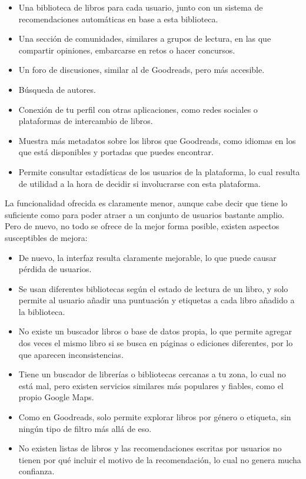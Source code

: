 \begin{itemize}
\item Una biblioteca de libros para cada usuario, junto con un sistema de recomendaciones automáticas en base a esta biblioteca.
\item Una sección de comunidades, similares a grupos de lectura, en las que compartir opiniones, embarcarse en retos o hacer concursos.
\item Un foro de discusiones, similar al de Goodreads, pero más accesible.
\item Búsqueda de autores.
\item Conexión de tu perfil con otras aplicaciones, como redes sociales o plataformas de intercambio de libros.
\item Muestra más metadatos sobre los libros que Goodreads, como idiomas en los que está disponibles y portadas que puedes encontrar.
\item Permite consultar estadísticas de los usuarios de la plataforma, lo cual resulta de utilidad a la hora de decidir si involucrarse con esta plataforma.
\end{itemize}

La funcionalidad ofrecida es claramente menor, aunque cabe decir que tiene lo suficiente como para poder atraer a un conjunto de usuarios bastante amplio. Pero de nuevo, no todo se ofrece de la mejor forma posible, existen aspectos susceptibles de mejora:

\begin{itemize}
\item De nuevo, la interfaz resulta claramente mejorable, lo que puede causar pérdida de usuarios.
\item Se usan diferentes bibliotecas según el estado de lectura de un libro, y solo permite al usuario añadir una puntuación y etiquetas a cada libro añadido a la biblioteca.
\item No existe un buscador libros o base de datos propia, lo que permite agregar dos veces el mismo libro si se busca en páginas o ediciones diferentes, por lo que aparecen inconsistencias.
\item Tiene un buscador de librerías o bibliotecas cercanas a tu zona, lo cual no está mal, pero existen servicios similares más populares y fiables, como el propio Google Maps.
\item Como en Goodreads, solo permite explorar libros por género o etiqueta, sin ningún tipo de filtro más allá de eso.
\item No existen listas de libros y las recomendaciones escritas por usuarios no tienen por qué incluir el motivo de la recomendación, lo cual no genera mucha confianza.
\end{itemize}

